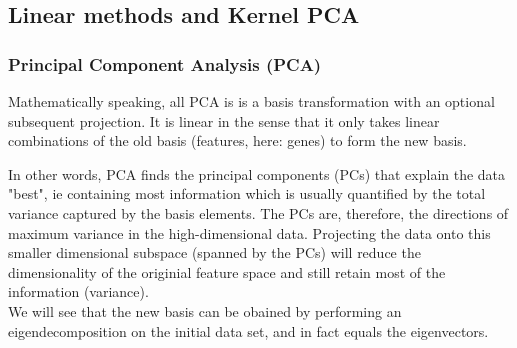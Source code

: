 \subsection{Linear methods and Kernel PCA}

\subsubsection{Principal Component Analysis (PCA)}


Mathematically speaking, all PCA is is a basis transformation with an optional subsequent projection. It is linear in the sense that it only takes linear combinations of the old basis (features, here: genes) to form the new basis. 

In other words, PCA finds the principal components (PCs) that explain the data "best", ie containing most information which is usually quantified by the total variance captured by the basis elements. The PCs are, therefore, the directions of maximum variance in the high-dimensional data. Projecting the data onto this smaller dimensional subspace (spanned by the PCs) will reduce the dimensionality of the originial feature space and still retain most of the information (variance). \\
We will see that the new basis can be obained by performing an eigendecomposition on the initial data set, and in fact equals the eigenvectors.



